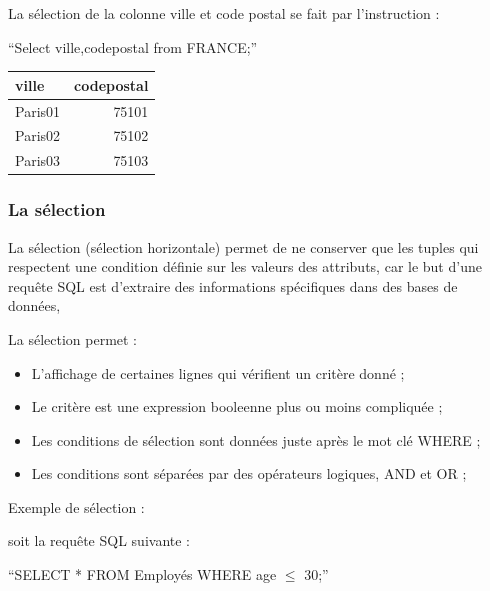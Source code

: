 \documentclass[oneside,13pt,a4paper]{report}
\begin{document}
La sélection de la colonne ville et code postal se fait par l'instruction :

\enquote{Select ville,codepostal from FRANCE;}

\begin{tabular}{|l|r|}
	\hline
	ville   & codepostal
	\\
	\hline
	Paris01 & 75101      \\
	Paris02 & 75102      \\
	Paris03 & 75103      \\
	\hline
\end{tabular}

\subsubsection{La sélection }

La sélection (sélection horizontale) permet de ne conserver que les tuples qui respectent une condition définie sur les valeurs des attributs, car le but d'une requête SQL est d'extraire des informations spécifiques dans des bases de données,

La sélection permet :
\begin{itemize}
	\item L'affichage de certaines lignes qui vérifient un critère donné ;
	\item Le critère est une expression booleenne plus ou moins compliquée ;
	\item Les conditions de sélection sont données juste après le mot clé WHERE ;
	\item Les conditions sont séparées par des opérateurs logiques, AND et OR ;
\end{itemize}
\pagebreak

Exemple de sélection :

soit la requête SQL suivante :

\begin{center}
	\enquote{SELECT * FROM Employés WHERE age $\leq$ 30;}
\end{center}
\end{document}
